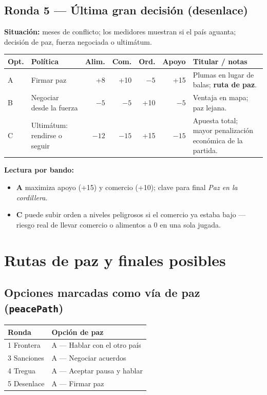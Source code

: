 \documentclass[11pt,a4paper]{article}
\begin{document}
\subsection{Ronda 5 --- Última gran decisión (desenlace)}

\textbf{Situación:} meses de conflicto; los medidores muestran si el país aguanta; decisión de paz, fuerza negociada o ultimátum.

\begin{longtable}{@{}p{0.9cm}p{4.2cm}rrrrp{3.2cm}@{}}
\toprule
\textbf{Opt.} & \textbf{Política} & \textbf{Alim.} & \textbf{Com.} & \textbf{Ord.} & \textbf{Apoyo} & \textbf{Titular / notas} \\
\midrule
A & Firmar paz & +8 & +10 & $-5$ & +15 &
  Plumas en lugar de balas; \textbf{ruta de paz}. \\
B & Negociar desde la fuerza & $-5$ & $-5$ & +10 & $-5$ &
  Ventaja en mapa; paz lejana. \\
C & Ultimátum: rendirse o seguir & $-12$ & $-15$ & +15 & $-15$ &
  Apuesta total; mayor penalización económica de la partida. \\
\bottomrule
\end{longtable}

\textbf{Lectura por bando:}
\begin{itemize}
  \item \textbf{A} maximiza apoyo (+15) y comercio (+10); clave para final \emph{Paz en la cordillera}.
  \item \textbf{C} puede subir orden a niveles peligrosos si el comercio ya estaba bajo --- riesgo real de llevar comercio o alimentos a 0 en una sola jugada.
\end{itemize}

\section{Rutas de paz y finales posibles}

\subsection{Opciones marcadas como vía de paz (\texttt{peacePath})}

\begin{center}
\begin{tabular}{ll}
\toprule
Ronda & Opción de paz \\
\midrule
1 Frontera & A --- Hablar con el otro país \\
3 Sanciones & A --- Negociar acuerdos \\
4 Tregua & A --- Aceptar pausa y hablar \\
5 Desenlace & A --- Firmar paz \\
\bottomrule
\end{tabular}
\end{center}
\end{document}
